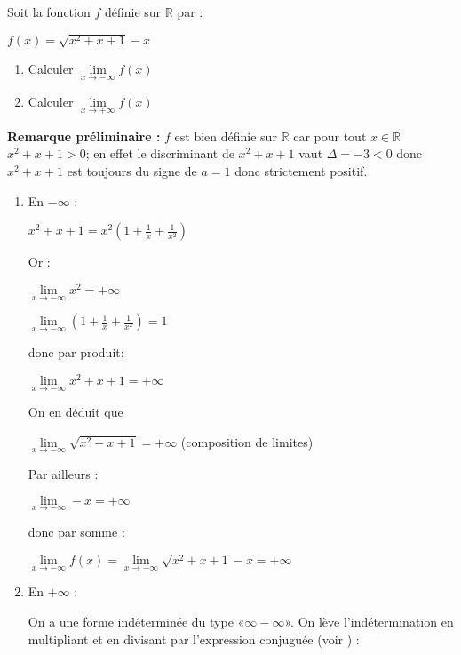 
%
Soit la fonction $f$ définie sur $\mathbb{R}$ par :
\par
$f\left(x\right)=\sqrt{x^2+x+1}-x$
\begin{enumerate}
     \item
     Calculer $\lim\limits_{x\rightarrow -\infty }f\left(x\right)$
     \item
     Calculer $\lim\limits_{x\rightarrow +\infty }f\left(x\right)$
\end{enumerate}
\begin{corrige}
     \textbf{Remarque préliminaire : }
     $f$ est bien définie sur $\mathbb{R}$ car pour tout $x \in  \mathbb{R}$ $x^{2}+x+1 > 0$; en effet le discriminant de $x^{2}+x+1$ vaut $\Delta =-3 < 0$ donc $x^{2}+x+1$ est toujours du signe de $a=1$ donc strictement positif.
     \begin{enumerate}
          \item
          En $-\infty $ :
          \par
          $x^{2}+x+1=x^{2}\left(1+\frac{1}{x}+\frac{1}{x^{2}}\right)$
          \par
          Or :
          \par
          $\lim\limits_{x\rightarrow -\infty }x^{2}=+\infty $
          \par
          $\lim\limits_{x\rightarrow -\infty }\left(1+\frac{1}{x}+\frac{1}{x^{2}}\right)=1$
          \par
          donc par produit:
          \par
          $\lim\limits_{x\rightarrow -\infty }x^{2}+x+1=+\infty $
          \par
          On en déduit que
          \par
          $\lim\limits_{x\rightarrow -\infty }\sqrt{x^{2}+x+1}=+\infty $ (composition de limites)
          \par
          Par ailleurs :
          \par
          $\lim\limits_{x\rightarrow -\infty }-x=+\infty $
          \par
          donc par somme :
          \par
          $\lim\limits_{x\rightarrow -\infty }f\left(x\right)=\lim\limits_{x\rightarrow -\infty }\sqrt{x^{2}+x+1}-x=+\infty $
          \item
          En $+\infty $ :
          \par
          On a une forme indéterminée du type «$\infty -\infty $». On lève l'indétermination en multipliant et en divisant par l'expression conjuguée (voir ) :

\end{enumerate}
\end{corrige}
